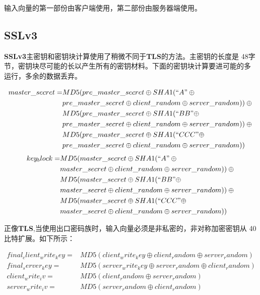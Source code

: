 \documentclass[11pt,dvips]{article}
\newcommand{\bfs}[1]{{\bf{#1}}}
\begin{document}
输入向量的第一部份由客户端使用，第二部份由服务器端使用。

\subsection{SSLv3}

\bfs{SSLv3}主密钥和密钥块计算使用了稍微不同于\bfs{TLS}的方法。主密钥的长度是
48字节，密钥块尽可能的长以产生所有的密钥材料。下面的密钥块计算要进可能的多
运行，多余的数据丢弃。

\begin{align*}
        master\_secret = &MD5(pre\_master\_secret \oplus SHA1(``A" \oplus {} \\
                        &pre\_master\_secret  \oplus client\_random \oplus server\_random)) \oplus  {} \\
                        &MD5(pre\_master\_secret \oplus SHA1(``BB" \oplus\\ {}
        &pre\_master\_secret \oplus client\_random \oplus
        server\_random))\oplus {} \\
        &MD5(pre\_master\_secret \oplus SHA1(``CCC" \oplus \\
        &pre\_master\_secret \oplus client\_random \oplus server\_random))
\end{align*}
\begin{align*}
        key_block = &MD5(master\_secret \oplus SHA1(``A" \oplus {} \\
                        &master\_secret  \oplus client\_random \oplus server\_random)) \oplus  {} \\
                        &MD5(master\_secret \oplus SHA1(``BB" \oplus\\ {}
        &master\_secret \oplus client\_random \oplus
        server\_random))\oplus {} \\
        &MD5(master\_secret \oplus SHA1(``CCC" \oplus \\
        &master\_secret \oplus client\_random \oplus server\_random))
\end{align*}


正像\bfs{TLS},当使用出口密码族时，输入向量必须是非私密的，非对称加密密钥从
40比特扩展。如下所示：

\begin{align*}
        final_client_write_key = & MD5(client_write_key \oplus client_random
        \oplus server_random) {} \\
        final_server_key  = & MD5(server_write_key \oplus server_random \oplus
        client_random) {} \\
        client_write_iv = &MD5(client_random \oplus server_random) {} \\
        server_write_iv = & MD5(server_random \oplus client_random)
\end{align*}
\end{document}
